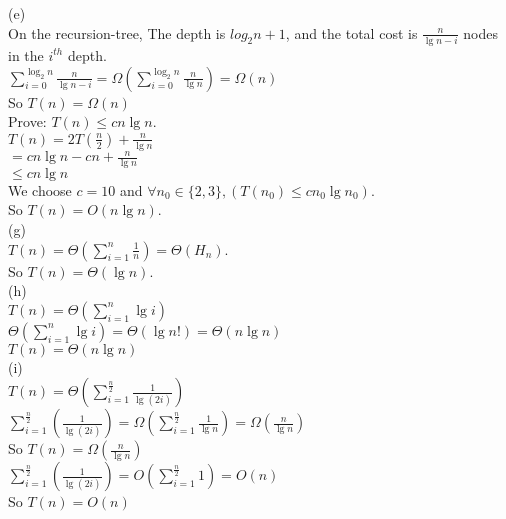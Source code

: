 \documentclass[a4paper, justified]{tufte-handout}
\begin{document}
\begin{solution}
  \noindent(e)\\
  On the  recursion-tree, The depth is  $log_2{n}+1$, and the total cost is  $\frac{n}{\lg n-i}$ nodes in the $i^{th}$ depth.\\
  $\sum\limits_{i=0}^{\log_2n} \frac{n}{\lg n-i}=\Omega(\sum\limits_{i=0}^{\log_2n} \frac{n}{\lg n})=\Omega(n)$\\
  So $T(n)=\Omega(n)$\\
  Prove: $T(n)\leq cn\lg n$.\\
  $T(n)=2T(\frac{n}{2})+\frac{n}{\lg n}$\\
  \hspace*{2.5em}$=cn\lg n-cn+\frac{n}{\lg n}$\\
  \hspace*{2.5em}$\leq cn\lg n$\\
  We choose $c=10$ and $\forall n_0\in\{2,3\},(T(n_0)\leq cn_0\lg n_0)$.\\
  So $T(n)=O(n\lg n)$.\\

  \noindent(g)\\
  $T(n)=\Theta(\sum\limits_{i=1}^{n}\frac{1}{n})=\Theta(H_n)$.\\
  So $T(n)=\Theta(\lg n)$.\\

  \noindent(h)\\
  $T(n)=\Theta(\sum\limits_{i=1}^{n}\lg i)$\\
  $\Theta(\sum\limits_{i=1}^{n}\lg i)=\Theta(\lg n!)=\Theta(n\lg n)$\\
  $T(n)=\Theta(n\lg n)$\\

  \noindent(i)\\
  $T(n)=\Theta(\sum\limits_{i=1}^{\frac{n}{2}}\frac{1}{\lg (2i)})$\\
  $\sum\limits_{i=1}^{\frac{n}{2}}(\frac{1}{\lg (2i)})=\Omega(\sum\limits_{i=1}^{\frac{n}{2}}\frac{1}{\lg n})=\Omega(\frac{n}{\lg n})$\\
  So $T(n)=\Omega(\frac{n}{\lg n})$\\
  $\sum\limits_{i=1}^{\frac{n}{2}}(\frac{1}{\lg (2i)})=O(\sum\limits_{i=1}^{\frac{n}{2}}1)=O(n)$\\
  So $T(n)=O(n)$
\end{solution}

\beginoptional

\begin{problem}
\end{problem}
\end{document}
